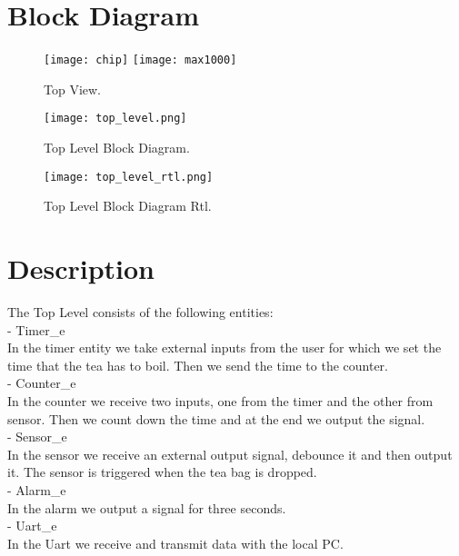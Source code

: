 \documentclass{report}
\begin{document}
\section{Block Diagram}
\begin{figure}[htbp]
{\texttt{[image: chip]}}
\hspace{3cm}
{\texttt{[image: max1000]}}
\caption{Top View.}
\label{fig}
\end{figure}
\begin{figure}[htbp]
\centerline{\texttt{[image: top\_level.png]}}
\caption{Top Level Block Diagram.}
\label{fig}
\vspace{2cm}
\centerline{\texttt{[image: top\_level\_rtl.png]}}
\caption{Top Level Block Diagram Rtl.}
\label{fig}
\end{figure}
\newpage

\section{Description}
\large
The Top Level consists of the following entities: \\
- Timer\_e \\
  In the timer entity we take external inputs from the user for which we set the time that the tea has to boil. Then we send the time to the counter. \\
- Counter\_e \\
  In the counter we receive two inputs, one from the timer and the other from sensor. Then we count down the time and at the end we output the signal.\\
- Sensor\_e \\
  In the sensor we receive an external output signal, debounce it and then output it. The sensor is triggered when the tea bag is dropped.\\
- Alarm\_e \\
  In the alarm we output a signal for three seconds.\\
- Uart\_e\\
  In the Uart we receive and transmit data with the local PC.\\
   

\vspace{2cm}
\end{document}
